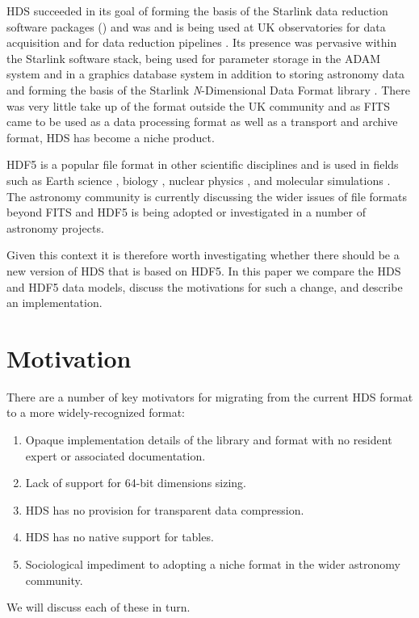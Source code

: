 \documentclass[final,authoryear,5p,times,twocolumn]{elsarticle}
\begin{document}
HDS succeeded in its goal of forming the basis of the Starlink data
reduction software packages () and was and is being
used at UK observatories for data acquisition and for data reduction
pipelines \citep{2011tfa..confE..42J,2015oracdr}. Its presence was
pervasive within the Starlink software stack, being used for parameter
storage in the ADAM system \citep{1992ASPC...25..126A} and in a
graphics database system \citep{SUN48} in addition to storing
astronomy data and forming the basis of the Starlink
\emph{N}-Dimensional Data Format library \citep[NDF;][]{2015Jenness}. There was
very little take up of the format outside the UK community \citep[but
see e.g.,][]{1993STARB..12...10M} and as FITS came to be used as a data
processing format as well as a transport and archive format, HDS has become a niche product.

HDF5 is a popular file format in other scientific disciplines and is
used in fields such as Earth science \citep[e.g.,][]{2005Yang}, biology
\citep[e.g.,][]{Dougherty:2009:UBI:1562764.1562781}, nuclear physics
\citep[e.g.,][]{1742-6596-425-6-062008}, and molecular simulations
\citep[e.g.,][]{deBuyl20141546}. The astronomy community is currently
discussing the wider issues of file formats beyond FITS
\citep{B1_adassxxiv,2015Thomas} and HDF5 is being adopted
\citep[e.g.,][]{2012ASPC..461..283A} or investigated
\citep[e.g.,][]{P3-1_adassxxiv,O4-4_adassxxiv} in a number of astronomy
projects.

Given this context it is therefore worth investigating whether there
should be a new version of HDS that is based on HDF5. In this paper we
compare the HDS and HDF5 data models, discuss the motivations for such
a change, and describe an implementation.

\section{Motivation}

There are a number of key motivators for migrating from the current HDS
format to a more widely-recognized format:
\begin{enumerate}
\item Opaque implementation details of the library and format with no
  resident expert or associated documentation.
\item Lack of support for 64-bit dimensions sizing.
\item HDS has no provision for transparent data compression.
\item HDS has no native support for tables.
\item Sociological impediment to adopting a niche format in the wider
  astronomy community.
\end{enumerate}
We will discuss each of these in turn.
\end{document}
